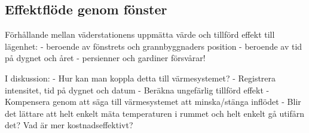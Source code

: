 \subsection{Effektflöde genom fönster}

Förhållande mellan väderstationens uppmätta värde och tillförd effekt till lägenhet:
- beroende av fönstrets och grannbyggnaders position
- beroende av tid på dygnet och året
- persienner och gardiner försvårar!

I diskussion:
- Hur kan man koppla detta till värmesystemet?
	- Registrera intensitet, tid på dygnet och datum
	- Beräkna ungefärlig tillförd effekt
	- Kompensera genom att säga till värmesystemet att minska/stänga inflödet
- Blir det lättare att helt enkelt mäta temperaturen i rummet och helt enkelt gå utifårn det? Vad är mer kostnadseffektivt?